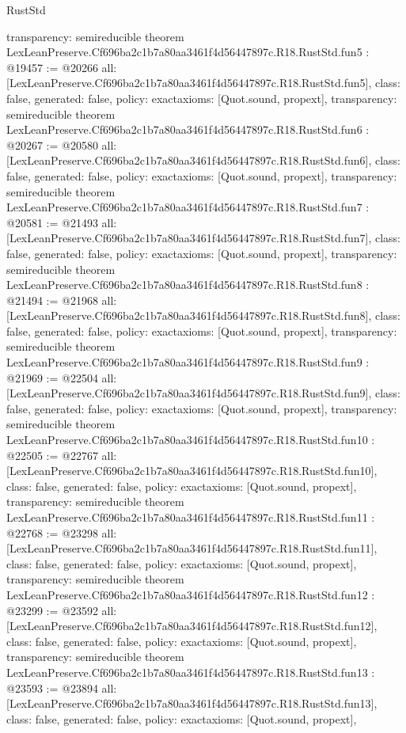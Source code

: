 \begin{lexlean}{RustStd}
\begin{coremodule}
{  transparency: semireducible
}
theorem LexLeanPreserve.Cf696ba2c1b7a80aa3461f4d56447897c.R18.RustStd.fun5 : @19457 := @20266 {
  all: [LexLeanPreserve.Cf696ba2c1b7a80aa3461f4d56447897c.R18.RustStd.fun5],
  class: false,
  generated: false,
  policy: exact{axioms: [Quot.sound, propext]},
  transparency: semireducible
}
theorem LexLeanPreserve.Cf696ba2c1b7a80aa3461f4d56447897c.R18.RustStd.fun6 : @20267 := @20580 {
  all: [LexLeanPreserve.Cf696ba2c1b7a80aa3461f4d56447897c.R18.RustStd.fun6],
  class: false,
  generated: false,
  policy: exact{axioms: [Quot.sound, propext]},
  transparency: semireducible
}
theorem LexLeanPreserve.Cf696ba2c1b7a80aa3461f4d56447897c.R18.RustStd.fun7 : @20581 := @21493 {
  all: [LexLeanPreserve.Cf696ba2c1b7a80aa3461f4d56447897c.R18.RustStd.fun7],
  class: false,
  generated: false,
  policy: exact{axioms: [Quot.sound, propext]},
  transparency: semireducible
}
theorem LexLeanPreserve.Cf696ba2c1b7a80aa3461f4d56447897c.R18.RustStd.fun8 : @21494 := @21968 {
  all: [LexLeanPreserve.Cf696ba2c1b7a80aa3461f4d56447897c.R18.RustStd.fun8],
  class: false,
  generated: false,
  policy: exact{axioms: [Quot.sound, propext]},
  transparency: semireducible
}
theorem LexLeanPreserve.Cf696ba2c1b7a80aa3461f4d56447897c.R18.RustStd.fun9 : @21969 := @22504 {
  all: [LexLeanPreserve.Cf696ba2c1b7a80aa3461f4d56447897c.R18.RustStd.fun9],
  class: false,
  generated: false,
  policy: exact{axioms: [Quot.sound, propext]},
  transparency: semireducible
}
theorem LexLeanPreserve.Cf696ba2c1b7a80aa3461f4d56447897c.R18.RustStd.fun10 : @22505 := @22767 {
  all: [LexLeanPreserve.Cf696ba2c1b7a80aa3461f4d56447897c.R18.RustStd.fun10],
  class: false,
  generated: false,
  policy: exact{axioms: [Quot.sound, propext]},
  transparency: semireducible
}
theorem LexLeanPreserve.Cf696ba2c1b7a80aa3461f4d56447897c.R18.RustStd.fun11 : @22768 := @23298 {
  all: [LexLeanPreserve.Cf696ba2c1b7a80aa3461f4d56447897c.R18.RustStd.fun11],
  class: false,
  generated: false,
  policy: exact{axioms: [Quot.sound, propext]},
  transparency: semireducible
}
theorem LexLeanPreserve.Cf696ba2c1b7a80aa3461f4d56447897c.R18.RustStd.fun12 : @23299 := @23592 {
  all: [LexLeanPreserve.Cf696ba2c1b7a80aa3461f4d56447897c.R18.RustStd.fun12],
  class: false,
  generated: false,
  policy: exact{axioms: [Quot.sound, propext]},
  transparency: semireducible
}
theorem LexLeanPreserve.Cf696ba2c1b7a80aa3461f4d56447897c.R18.RustStd.fun13 : @23593 := @23894 {
  all: [LexLeanPreserve.Cf696ba2c1b7a80aa3461f4d56447897c.R18.RustStd.fun13],
  class: false,
  generated: false,
  policy: exact{axioms: [Quot.sound, propext]},
}
\end{coremodule}
\end{lexlean}
